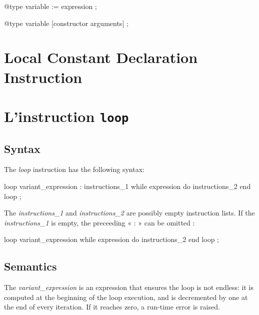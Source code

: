 {
\begin{galgascode}
@type variable := expression ;
\end{galgascode}
}

{
\begin{galgascode}
@type variable [constructor arguments] ;
\end{galgascode}
}


\section{Local Constant Declaration Instruction}








\section{L'instruction \texttt{loop}}


\subsection{Syntax}

The \emph{loop} instruction has the following syntax:
{
\begin{galgascode}
loop variant_expression
: instructions_1
while expression do
  instructions_2
end loop ;  
\end{galgascode}
}

The \emph{instructions\_1} and \emph{instructions\_2} are possibly empty instruction lists. If the \emph{instructions\_1} is empty, the preceeding « : » can be omitted :
{
\begin{galgascode}
loop variant_expression
while expression do
  instructions_2
end loop ;  
\end{galgascode}
}

\subsection{Semantics}

The \emph{variant\_expression} is an  expression that ensures the loop is not endless: it is computed at the beginning of the loop execution, and is decremented by one at the end of every iteration. If it reaches zero, a run-time error is raised.

